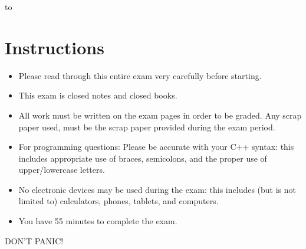 \documentclass[11pt,answers]{exam}
\begin{document}
\begin{center} 
\end{center}

\lstset{language=C++,numbers=left, numberstyle=\tiny, stepnumber=1, numbersep=5pt, showstringspaces=true}

\vspace{0.1in} 
\hbox to \textwidth{Name:\enspace\hrulefill}

\section*{Instructions}
\begin{itemize}
\item Please read through this entire exam very carefully before starting. 
\item This exam is closed notes and closed books.
\item All work must be written on the exam pages in order to be graded. Any scrap paper used, must be the scrap paper provided during the exam period.
\item For programming questions: Please be accurate with your C++ syntax: this includes appropriate use of braces, semicolons, and the proper use of upper/lowercase letters.  
\item No electronic devices may be used during the exam: this includes (but is not limited to) calculators, phones, tablets, and computers.
\item You have 55 minutes to complete the exam.  
\end{itemize}

\begin{center}
{\Huge DON'T PANIC!}
\end{center}

\begin{center} 
	\combinedgradetable[h]
\end{center}
\newpage
\end{document}
